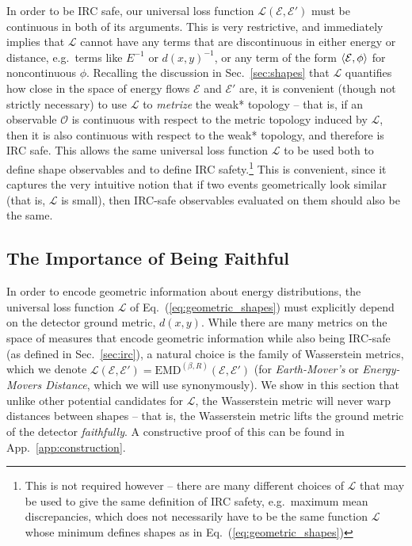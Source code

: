 \documentclass[letterpaper,11pt]{article}
\newcommand{\E}{\mathcal{E}}
\newcommand{\EMD}{\text{EMD}}
\renewcommand{\O}{\mathcal{O}}
\DeclareRobustCommand{\Sec}[1]{Sec.~\ref{sec:#1}}
\DeclareRobustCommand{\App}[1]{App.~\ref{app:#1}}
\DeclareRobustCommand{\Eq}[1]{Eq.~(\ref{eq:#1})}
\begin{document}
In order to be IRC safe, our universal loss function $\mathcal{L}(\E,\E')$ must be continuous in both of its arguments. 
%
This is very restrictive, and immediately implies that $\mathcal{L}$ cannot have any terms that are discontinuous in either energy or distance, e.g.\ terms like $E^{-1}$ or $d(x,y)^{-1}$, or any term of the form $\expval{\E, \phi}$ for noncontinuous $\phi$.
%
Recalling the discussion in \Sec{shapes} that $\mathcal{L}$ quantifies how close in the space of energy flows $\E$ and $\E'$ are, it is convenient (though not strictly necessary) to use $\mathcal{L}$ to \emph{metrize} the weak* topology -- that is, if an observable $\O$ is continuous with respect to the metric topology induced by $\mathcal{L}$, then it is also continuous with respect to the weak* topology, and therefore is IRC safe. 
%
This allows the same universal loss function $\mathcal{L}$ to be used both to define shape observables and to define IRC safety.\footnote{This is not required however -- there are many different choices of $\mathcal{L}$ that may be used to give the same definition of IRC safety, e.g.\ maximum mean discrepancies, which does not necessarily have to be the same function $\mathcal{L}$ whose minimum defines shapes as in \Eq{geometric_shapes}}
%
This is convenient, since it captures the very intuitive notion that if two events geometrically look similar (that is, $\mathcal{L}$ is small), then IRC-safe observables evaluated on them should also be the same.




\subsection{The Importance of Being Faithful}\label{sec:wasserstein}

In order to encode geometric information about energy distributions, the universal loss function $\mathcal{L}$ of \Eq{geometric_shapes} must explicitly depend on the detector ground metric, $d(x,y)$. While there are many metrics on the space of measures that encode geometric information while also being IRC-safe (as defined in \Sec{irc}), a natural choice is the family of Wasserstein metrics, which we denote $\mathcal{L}(\E, \E') = \EMD^{(\beta,R)}(\E, \E')$ (for \emph{Earth-Mover's} or \emph{Energy-Movers Distance}, which we will use synonymously). We show in this section that unlike other potential candidates for $\mathcal{L}$, the Wasserstein metric will never warp distances between shapes -- that is, the Wasserstein metric lifts the ground metric of the detector \emph{faithfully}. A constructive proof of this can be found in \App{construction}.
\end{document}

